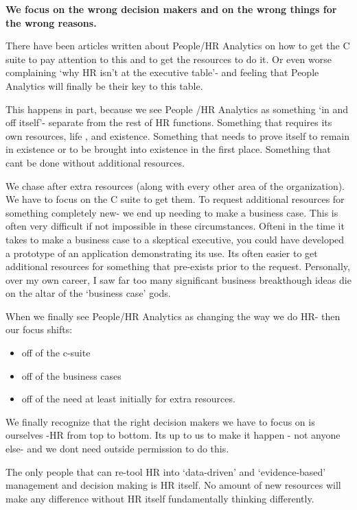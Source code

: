\documentclass[12pt,letterpaper]{article}
\begin{document}
\textbf{We focus on the wrong decision makers and on the wrong things
for the wrong reasons.}

There have been articles written about People/HR Analytics on how to get
the C suite to pay attention to this and to get the resources to do it.
Or even worse complaining `why HR isn't at the executive table'- and
feeling that People Analytics will finally be their key to this table.

This happens in part, because we see People /HR Analytics as something
`in and off itself'- separate from the rest of HR functions. Something
that requires its own resources, life , and existence. Something that
needs to prove itself to remain in existence or to be brought into
existence in the first place. Something that cant be done without
additional resources.

We chase after extra resources (along with every other area of the
organization). We have to focus on the C suite to get them. To request
additional resources for something completely new- we end up needing to
make a business case. This is often very difficult if not impossible in
these circumstances. Ofteni in the time it takes to make a business case
to a skeptical executive, you could have developed a prototype of an
application demonstrating its use. Its often easier to get additional
resources for something that pre-exists prior to the request.
Personally, over my own career, I saw far too many significant business
breakthough ideas die on the altar of the `business case' gods.

When we finally see People/HR Analytics as changing the way we do HR-
then our focus shifts:

\begin{itemize}
\item
  off of the c-suite
\item
  off of the business cases
\item
  off of the need at least initially for extra resources.
\end{itemize}

We finally recognize that the right decision makers we have to focus on
is ourselves -HR from top to bottom. Its up to us to make it happen -
not anyone else- and we dont need outside permission to do this.

The only people that can re-tool HR into `data-driven' and
`evidence-based' management and decision making is HR itself. No amount
of new resources will make any difference without HR itself
fundamentally thinking differently.
\end{document}

